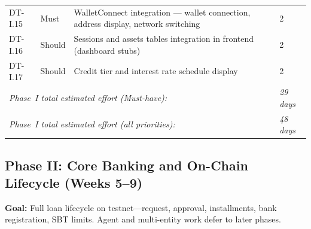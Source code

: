 \documentclass[12pt, a4paper]{report}
\begin{document}
\begin{table}[H]
\begin{tabular}{p{1.8cm}p{1.8cm}p{7.5cm}p{1.5cm}}
DT-I.15 & Must & WalletConnect integration --- wallet connection, address display, network switching & 2 \\
DT-I.16 & Should & Sessions and assets tables integration in frontend (dashboard stubs) & 2 \\
DT-I.17 & Should & Credit tier and interest rate schedule display & 2 \\
\multicolumn{3}{l}{\textit{Phase~I total estimated effort (Must-have):}} & \textit{29 days} \\
\multicolumn{3}{l}{\textit{Phase~I total estimated effort (all priorities):}} & \textit{48 days} \\
\bottomrule
\end{tabular}
\end{table}

\vspace{2pt}

\subsection{Phase II: Core Banking and On-Chain Lifecycle (Weeks 5--9)}

\textbf{Goal:} Full loan lifecycle on testnet---request, approval, installments, bank registration, SBT limits. Agent and multi-entity work defer to later phases.
\end{document}
